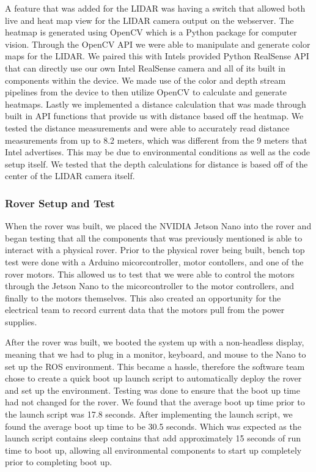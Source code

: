 \documentclass[a4paper, 10pt]{article}
\begin{document}
    A feature that was added for the LIDAR was having a switch that allowed both live and heat map view for the LIDAR camera output on the webserver. The heatmap is generated using OpenCV which is a Python package for computer vision. Through the OpenCV API we were able to manipulate and generate color maps for the LIDAR. We paired this with Intels provided Python RealSense API that can directly use our own Intel RealSense camera and all of its built in components within the device. We made use of the color and depth stream pipelines from the device to then utilize OpenCV to calculate and generate heatmaps. 
    Lastly we implemented a distance calculation that was made through built in API functions that provide us with distance based off the heatmap. 
    We tested the distance measurements and were able to accurately read distance measurements from up to 8.2 meters, which was different from the 9 meters that Intel advertises. This may be due to environmental conditions as well as the code setup itself. We tested that the depth calculations for distance is based off of the center of the LIDAR camera itself.

    \subsubsection*{Rover Setup and Test}
    When the rover was built, we placed the NVIDIA Jetson Nano into the rover and began testing that all the components that was previously mentioned is able to interact with a physical rover. Prior to the physical rover being built, bench top test were done with a Arduino micorcontroller, motor contollers, and one of the rover motors. This allowed us to test that we were able to control the motors through the Jetson Nano to the micorcontroller to the motor controllers, and finally to the motors themselves. This also created an opportunity for the electrical team to record current data that the motors pull from the power supplies. 

    After the rover was built, we booted the system up with a non-headless display, meaning that we had to plug in a monitor, keyboard, and mouse to the Nano to set up the ROS environment. This became a hassle, therefore the software team chose to create a quick boot up launch script to automatically deploy the rover and set up the environment. Testing was done to ensure that the boot up time had not changed for the rover.
    We found that the average boot up time prior to the launch script was 17.8 seconds. 
    After implementing the launch script, we found the average boot up time to be 30.5 seconds. Which was expected as the launch script contains sleep contains that add approximately 15 seconds of run time to boot up, allowing all environmental components to start up completely prior to completing boot up.
\end{document}
